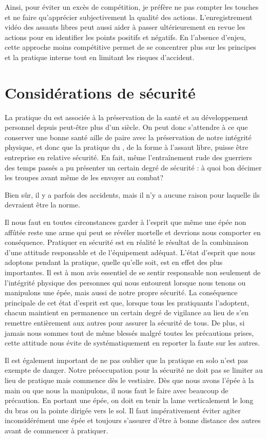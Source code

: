 Ainsi, pour éviter un excès de compétition, je préfère ne pas compter les touches et ne faire qu'apprécier subjectivement la qualité des actions.  L'enregistrement vidéo des assauts libres peut aussi aider à passer ultérieurement en revue les actions pour en identifier les points positifs et négatifs. 
En l'absence d'enjeu, cette approche moins compétitive permet de se concentrer plus sur les principes et la pratique interne tout en limitant les risques d'accident. 


\section{Considérations de sécurité}
La pratique du \Taiji{} est associée à la préservation de la santé et au développement personnel depuis peut-être plus d'un siècle.  On peut donc s'attendre à ce que conserver une bonne santé aille de paire avec la préservation de notre intégrité physique, et donc que la pratique du \Taijijian{}, de la forme à l'assaut libre, puisse être entreprise en relative sécurité.
En fait, même l'entraînement rude des guerriers des temps passés a pu présenter un certain degré de sécurité : à quoi bon décimer les troupes avant même de les envoyer au combat?

Bien sûr, il y a parfois des accidents, mais il n'y a aucune raison pour laquelle ils devraient être la norme. 

Il nous faut en toutes circonstances garder à l'esprit que même une épée non affûtée reste une arme qui peut se révéler mortelle et devrions nous comporter en conséquence. 
Pratiquer en sécurité est en réalité le résultat de la combinaison d'une attitude responsable et de l'équipement adéquat. 
L'état d'esprit que nous adoptons pendant la pratique, quelle qu'elle soit, est en effet des plus importantes. Il est à mon avis essentiel de se sentir responsable non seulement de l'intégrité physique des personnes qui nous entourent lorsque nous tenons ou manipulons une épée, mais aussi de notre propre sécurité. 
La conséquence principale de cet état d'esprit est que, lorsque tous les pratiquants l'adoptent, chacun maintient en permanence un certain degré de vigilance au lieu de s'en remettre entièrement aux autres pour assurer la sécurité de tous. 
De plus, si jamais nous sommes tout de même blessés malgré toutes les précautions prises, cette attitude nous évite de systématiquement en reporter la faute sur les autres. 

Il est également important de ne pas oublier que la pratique en solo n'est pas exempte de danger.  Notre préoccupation pour la sécurité ne doit pas se limiter au lieu de pratique mais commence dès le vestiaire. 
Dès que nous avons l'épée à la main ou que nous la manipulons, il nous faut le faire avec beaucoup de précaution. En portant une épée, on doit en tenir la lame verticalement le long du bras ou la pointe dirigée vers le sol. Il faut impérativement éviter agiter inconsidérément une épée et toujours s'assurer d'être à bonne distance des autres avant de commencer à pratiquer. 

